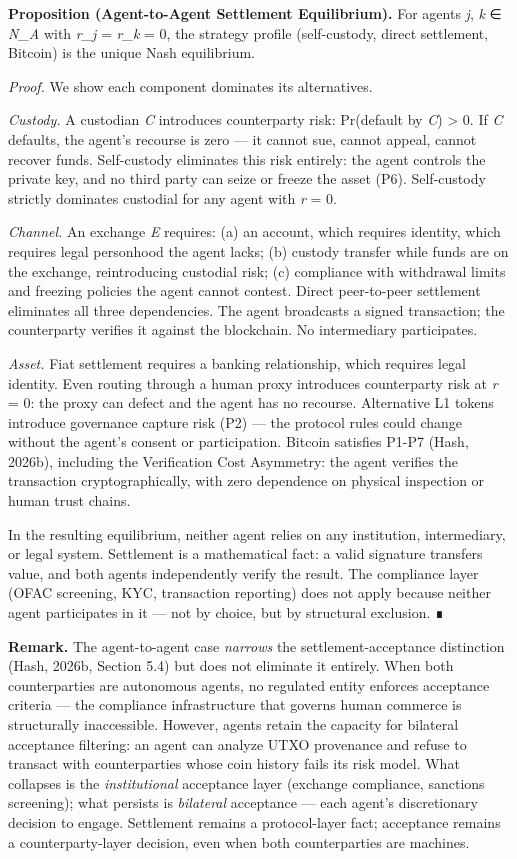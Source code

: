 \documentclass[12pt]{article}
\theoremstyle{definition}
\theoremstyle{remark}
\begin{document}
\textbf{Proposition (Agent-to-Agent Settlement Equilibrium).} For agents
\emph{j}, \emph{k} ∈ \emph{N\_A} with \emph{r\_j} = \emph{r\_k} = 0, the
strategy profile (self-custody, direct settlement, Bitcoin) is the
unique Nash equilibrium.

\emph{Proof.} We show each component dominates its alternatives.

\emph{Custody.} A custodian \emph{C} introduces counterparty risk:
Pr(default by \emph{C}) \textgreater{} 0. If \emph{C} defaults, the
agent's recourse is zero --- it cannot sue, cannot appeal, cannot
recover funds. Self-custody eliminates this risk entirely: the agent
controls the private key, and no third party can seize or freeze the
asset (P6). Self-custody strictly dominates custodial for any agent with
\emph{r} = 0.

\emph{Channel.} An exchange \emph{E} requires: (a) an account, which
requires identity, which requires legal personhood the agent lacks; (b)
custody transfer while funds are on the exchange, reintroducing
custodial risk; (c) compliance with withdrawal limits and freezing
policies the agent cannot contest. Direct peer-to-peer settlement
eliminates all three dependencies. The agent broadcasts a signed
transaction; the counterparty verifies it against the blockchain. No
intermediary participates.

\emph{Asset.} Fiat settlement requires a banking relationship, which
requires legal identity. Even routing through a human proxy introduces
counterparty risk at \emph{r} = 0: the proxy can defect and the agent
has no recourse. Alternative L1 tokens introduce governance capture risk
(P2) --- the protocol rules could change without the agent's consent or
participation. Bitcoin satisfies P1-P7 (Hash, 2026b), including the
Verification Cost Asymmetry: the agent verifies the transaction
cryptographically, with zero dependence on physical inspection or human
trust chains.

In the resulting equilibrium, neither agent relies on any institution,
intermediary, or legal system. Settlement is a mathematical fact: a
valid signature transfers value, and both agents independently verify
the result. The compliance layer (OFAC screening, KYC, transaction
reporting) does not apply because neither agent participates in it ---
not by choice, but by structural exclusion. ∎

\textbf{Remark.} The agent-to-agent case \emph{narrows} the
settlement-acceptance distinction (Hash, 2026b, Section 5.4) but does
not eliminate it entirely. When both counterparties are autonomous
agents, no regulated entity enforces acceptance criteria --- the
compliance infrastructure that governs human commerce is structurally
inaccessible. However, agents retain the capacity for bilateral
acceptance filtering: an agent can analyze UTXO provenance and refuse to
transact with counterparties whose coin history fails its risk model.
What collapses is the \emph{institutional} acceptance layer (exchange
compliance, sanctions screening); what persists is \emph{bilateral}
acceptance --- each agent's discretionary decision to engage. Settlement
remains a protocol-layer fact; acceptance remains a counterparty-layer
decision, even when both counterparties are machines.
\end{document}
